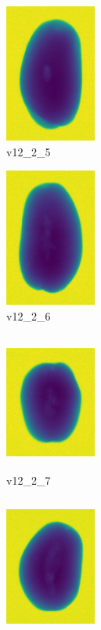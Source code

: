 \documentclass[11pt]{article}
\begin{document}
\begin{figure}
    
         \begin{subfigure}[b]{0.15\textwidth}
         \centering
         \includegraphics[width=3cm, height=4.5cm]{images/kartofler/v12_2_5_cut.png}
         \caption{v12\_2\_5}
         \label{fig:y equals x}
     \end{subfigure}
     \hfill
     \begin{subfigure}[b]{0.15\textwidth}
         \centering
         \includegraphics[width=3cm, height=4.5cm]{images/kartofler/v12_2_6_cut.png}
        \caption{v12\_2\_6}
         \label{fig:three sin x}
     \end{subfigure}
     \hfill
     \begin{subfigure}[b]{0.15\textwidth}
         \centering
         \includegraphics[width=3cm, height=4.5cm]{images/kartofler/v12_2_7_cut.png}
        \caption{v12\_2\_7}
         \label{fig:five over x}
     \end{subfigure}
     \hfill
    \begin{subfigure}[b]{0.15\textwidth}
         \centering
         \includegraphics[width=3cm, height=4.5cm]{images/kartofler/v12_2_8_cut.png}

\end{subfigure}
\end{figure}
\end{document}
